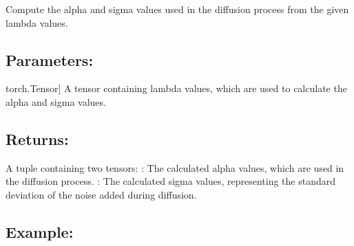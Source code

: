 \documentclass[a4paper,10pt,english]{sphinxmanual}
\begin{document}
\begin{fulllineitems}
\label{\detokenize{models:fireDiff.Models.utils.compute_alpha_sigma}}
\pysigstartsignatures
{}
\pysigstopsignatures
\sphinxAtStartPar
Compute the alpha and sigma values used in the diffusion process from the
given lambda values.


\subsection{Parameters:}
\label{\detokenize{models:id48}}\begin{description}
\sphinxlineitem{lambda\_tau}{[}torch.Tensor{]}
\sphinxAtStartPar
A tensor containing lambda values, which are used to calculate the
alpha and sigma values.

\end{description}


\subsection{Returns:}
\label{\detokenize{models:id49}}\begin{description}
\sphinxAtStartPar
A tuple containing two tensors:
\sphinxhyphen{} : The calculated alpha values, which are used in the
diffusion process.
\sphinxhyphen{} : The calculated sigma values, representing the standard
deviation of the noise added during diffusion.

\end{description}


\subsection{Example:}
\label{\detokenize{models:example}}
\begin{sphinxVerbatim}[commandchars=\\\{\}]
  \PYG{p}{[}  \PYG{p}{]}
   
\end{sphinxVerbatim}

\end{fulllineitems}
\end{document}
